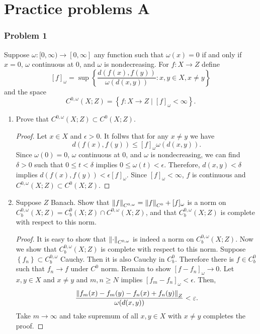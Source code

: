 \documentclass[a4paper]{article}
\begin{document}
\section{Practice problems A}
\subsubsection*{Problem 1}
Suppose $\omega: [0, \infty) \to [0, \infty]$ any function 
such that $\omega(x) = 0$ if and only if $x = 0$, 
$\omega$ continuous at 
$0$, and $\omega$ is nondecreasing. For $f: X \to Z$ define
\[
[f]_\omega = \sup\left\{ \frac{d(f(x),f(y))}{\omega(d(x,y))} :
x, y \in X, x \neq y \right\}
\]
and the space 
\[
C^{0, \omega} (X; Z) = \left\{ f: X \to Z \mid [f]_\omega < \infty \right\}.
\]
{
\newcommand{\cw}{{C^{0, \omega}}}
\newcommand{\cwb}{{C^{0, \omega}_b}}
\begin{enumerate}
  \item Prove that $\cw(X; Z) \subset C^0(X; Z)$.
  \begin{proof}
    Let $x \in X$ and $\epsilon > 0$. It follws that for 
    any $x \neq y$ we have 
    \[
    d(f(x), f(y)) \leq [f]_\omega \omega(d(x, y)).
    \]
    Since $\omega(0) = 0$, $\omega$ continuous
    at $0$, and $\omega$ is nondecreasing, we can find 
    $\delta > 0$ such that $0 \leq t < \delta$ implies 
    $0 \leq \omega(t) < \epsilon$. 
    Therefore,
    $d(x, y) < \delta$ implies $d(f(x), f(y)) < \epsilon [f]_{\omega}$.
    Since $[f]_{\omega} < \infty$, $f$ is continuous and 
    $\cw (X; Z) \subset C^0(X; Z)$.
  \end{proof}

  \item Suppose $Z$ Banach. Show that $\norm{f}_{\cw} = \norm{f}_{C^0} + [f]_\omega$
  is a norm on $\cwb(X; Z) = C^0_b(X; Z) \cap \cw(X; Z)$, and 
  that $\cwb(X;Z)$ is complete with respect to this norm.

  \begin{proof}
    It is easy to show that $\norm{\cdot}_{\cw}$ is indeed a
    norm on $\cwb(X; Z)$. Now we show that $\cwb(X; Z)$
    is complete with respect to this norm.
    Suppose $\left\{ f_n \right\} \subset \cwb$ Cauchy. Then 
    it is also Cauchy in $C^0_b$. Therefore there is $f \in C^0_b$
    such that $f_n \to f$ under $C^0$ norm. Remain to show 
    $[f - f_n]_\omega \to 0$. Let $x, y \in X$ and $x \neq y$
    and $m, n \geq N$ implies $[f_m - f_n]_\omega < \epsilon$.
    Then, 
    \[
    \begin{aligned}
      \frac{\left\lVert f_m(x) - f_m(y) - f_n(x) + f_n(y)\right\rVert_Z}{\omega(d(x, y))}
      < \varepsilon.
    \end{aligned}
    \]
    Take $m \to \infty$ and take supremum of all 
    $x, y \in X$ with $x \neq y$
    completes the proof.
  \end{proof}


\end{enumerate}}
\end{document}

